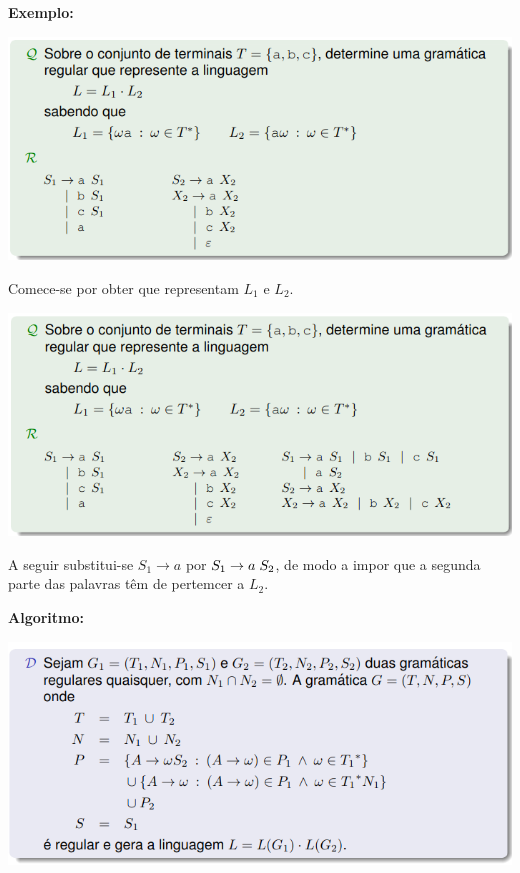 \documentclass{article}
\begin{document}
\begin{flushleft}
  \textbf{Exemplo:}

  \begin{center}
    \includegraphics[scale=0.4]{8}
  \end{center}

  Comece-se por obter que representam $L_1$ e $L_2$.

  \begin{center}
    \includegraphics[scale=0.4]{9}
  \end{center}

  A seguir substitui-se $S_1 \rightarrow a$ por $S_1 \rightarrow a \hspace{1mm} S_2$,
  de modo a impor que a segunda parte das palavras têm de pertemcer a $L_2$.

  \item \textbf{Algoritmo:}
  
  \begin{center}
    \includegraphics[scale=0.4]{10}
  \end{center}


\end{flushleft}
\end{document}

